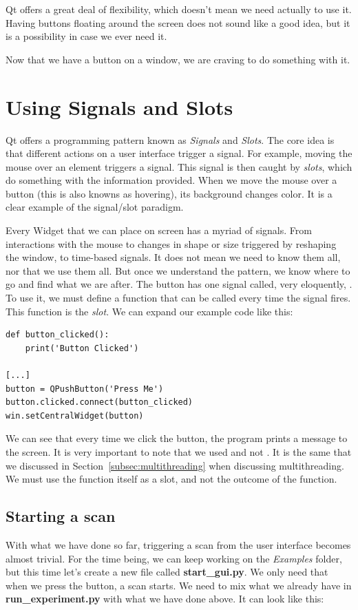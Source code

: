 Qt offers a great deal of flexibility, which doesn't mean we need actually to use it. Having buttons floating around the screen does not sound like a good idea, but it is a possibility in case we ever need it.

Now that we have a button on a window, we are craving to do something with it.


\section{Using Signals and Slots}\label{sec:signals-slots}
Qt offers a programming pattern known as \emph{Signals} and \emph{Slots}. The core idea is that different actions on a user interface trigger a signal. For example, moving the mouse over an element triggers a signal. This signal is then caught by \emph{slots}, which do something with the information provided. When we move the mouse over a button (this is also knowns as hovering), its background changes color. It is a clear example of the signal/slot paradigm.

Every Widget that we can place on screen has a myriad of signals. From interactions with the mouse to changes in shape or size triggered by reshaping the window, to time-based signals. It does not mean we need to know them all, nor that we use them all. But once we understand the pattern, we know where to go and find what we are after. The button has one signal called, very eloquently, . To use it, we must define a function that can be called every time the signal fires. This function is the \emph{slot}. We can expand our example code like this:

\begin{verbatim}
def button_clicked():
    print('Button Clicked')

[...]
button = QPushButton('Press Me')
button.clicked.connect(button_clicked)
win.setCentralWidget(button)
\end{verbatim}

We can see that every time we click the button, the program prints a message to the screen. It is very important to note that we used  and not . It is the same that we discussed in Section~\ref{subsec:multithreading} when discussing multithreading. We must use the function itself as a slot, and not the outcome of the function.

\subsection{Starting a scan}\label{subsec:start-scan-gui}
With what we have done so far, triggering a scan from the user interface becomes almost trivial. For the time being, we can keep working on the \emph{Examples} folder, but this time let's create a new file called \textbf{start\_gui.py}. We only need that when we press the button, a scan starts. We need to mix what we already have in \textbf{run\_experiment.py} with what we have done above. It can look like this:

